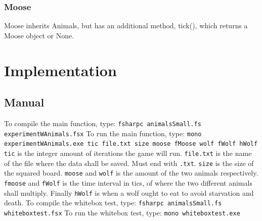 \documentclass{article}
\begin{document}
    
    \subsubsection{Moose}
    	Moose inherits Animals, but has an additional method, tick(), which returns a Moose object or None.

    \section{Implementation}
        \subsection{Manual}
    To compile the main function, type: \newline \verb|fsharpc animalsSmall.fs experimentWAnimals.fsx|\newline
    To run the main function, type: \newline \verb|mono experimentWAnimals.exe tic file.txt size moose fMoose wolf fWolf hWolf|\newline
    \verb|tic| is the integer amount of iterations the game will run. \verb|file.txt| is the name of the file where the data shall be saved. Must end with \verb|.txt|. \verb|size| is the size of the squared board. \verb|moose|
    and \verb|wolf| is the amount of the two animals respectively. \verb|fmoose| and \verb|fWolf| is the time interval in tics, of where the two different animals shall multiply. Finally \verb|hWolf| is when a wolf ought to eat to avoid starvation and death.\newline \newline
    To compile the whitebox test, type: \newline \verb|fsharpc animalsSmall.fs whiteboxtest.fsx|\newline
    To run the whitebox test, type: \newline \verb|mono whiteboxtest.exe|\newline
    
\end{document}

